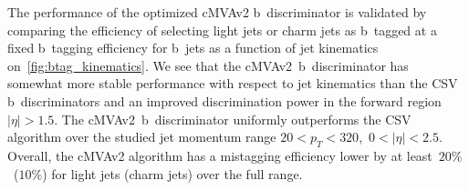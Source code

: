 \begin{figure}
\begin{centering}
\label{fig:btag_cmva_roc}
\end{centering}
\end{figure}

The performance of the optimized cMVAv2 b~discriminator is validated by comparing the efficiency of selecting light jets or charm jets as b~tagged at a fixed b~tagging efficiency for b~jets as a function of jet kinematics on~\cref{fig:btag_kinematics}. We see that the cMVAv2~b~discriminator has somewhat more stable performance with respect to jet kinematics than the CSV b~discriminators and an improved discrimination power in the forward region $|\eta| > 1.5$. The cMVAv2~b~discriminator uniformly outperforms the CSV algorithm over the studied jet momentum range $20 < p_T < 320$,~$0 < |\eta| < 2.5$. Overall, the cMVAv2 algorithm has a mistagging efficiency lower by at least~$20\%$~($10\%$) for light jets (charm jets) over the full range.

